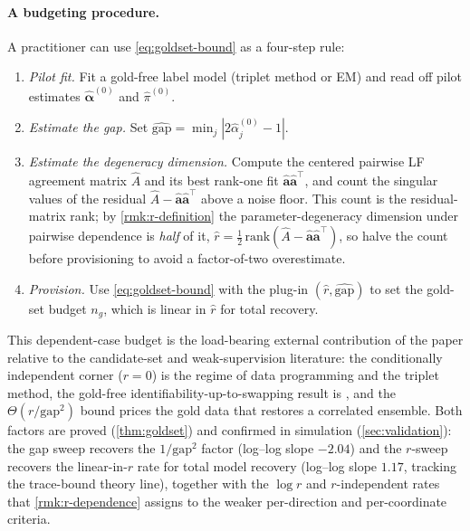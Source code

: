 \paragraph{A budgeting procedure.} A practitioner can use
\eqref{eq:goldset-bound} as a four-step rule:
\begin{enumerate}[label=(\arabic*)]
\item \emph{Pilot fit.} Fit a gold-free label model (triplet method
  or EM) and read off pilot estimates $\hat{\bm{\alpha}}^{(0)}$ and
  $\hat\pi^{(0)}$.
\item \emph{Estimate the gap.} Set
  $\widehat{\mathrm{gap}} = \min_j |2\hat\alpha_j^{(0)} - 1|$.
\item \emph{Estimate the degeneracy dimension.} Compute the centered
  pairwise LF agreement matrix $\hat A$ and its best rank-one fit
  $\hat{\bm{a}}\hat{\bm{a}}^\top$, and count the singular values of the
  residual $\hat A - \hat{\bm{a}}\hat{\bm{a}}^\top$ above a noise floor.
  This count is the residual-matrix rank; by \cref{rmk:r-definition}
  the parameter-degeneracy dimension under pairwise dependence is
  \emph{half} of it, $\hat r = \tfrac{1}{2}\,\mathrm{rank}(\hat A -
  \hat{\bm{a}}\hat{\bm{a}}^\top)$, so halve the count before
  provisioning to avoid a factor-of-two overestimate.
\item \emph{Provision.} Use \eqref{eq:goldset-bound} with the
  plug-in $(\hat r, \widehat{\mathrm{gap}})$ to set the gold-set
  budget $n_g$, which is linear in $\hat r$ for total recovery.
\end{enumerate}

This dependent-case budget is the load-bearing external contribution
of the paper relative to the candidate-set and weak-supervision
literature: the conditionally independent corner ($r = 0$) is the
regime of data programming and the triplet method, the gold-free
identifiability-up-to-swapping result is \citet{yu2022nplm}, and the
$\Theta(r/\mathrm{gap}^2)$ bound prices the gold data that restores a
correlated ensemble. Both factors are proved
(\cref{thm:goldset}) and confirmed in simulation
(\cref{sec:validation}): the gap sweep recovers the $1/\mathrm{gap}^2$
factor (log--log slope $-2.04$) and the $r$-sweep recovers the
linear-in-$r$ rate for total model recovery (log--log slope $1.17$,
tracking the trace-bound theory line), together with the
$\log r$ and $r$-independent rates that \cref{rmk:r-dependence} assigns
to the weaker per-direction and per-coordinate criteria.
